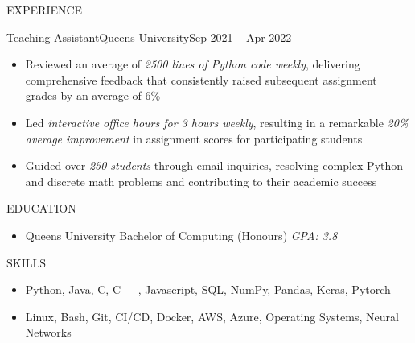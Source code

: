 \documentclass[]{mcdowellcv}
\begin{document}
\begin{cvsection}{EXPERIENCE}
\begin{cvsubsection}{Teaching Assistant}{Queen\textquotesingle{}s University}{Sep 2021 -- Apr 2022}
		\begin{itemize}%
			\item Reviewed an average of \textit{2500 lines of Python code weekly}, delivering comprehensive feedback that consistently raised subsequent assignment grades by an average of 6\%
			\item Led \textit{interactive office hours for 3 hours weekly}, resulting in a remarkable \textit{20\% average improvement} in assignment scores for participating students
			\item Guided over \textit{250 students} through email inquiries, resolving complex Python and discrete math problems and contributing to their academic success
		\end{itemize}
	\end{cvsubsection}
\end{cvsection}
\begin{cvsection}{EDUCATION}
	\begin{cvsubsection}{}{}{}
		\begin{itemize}
			\item Queen\textquotesingle{}s University \textbar{} Bachelor of Computing (Honours) \textbar{} \textit{GPA: 3.8}
		\end{itemize}
	\end{cvsubsection}
\end{cvsection}
\begin{cvsection}{SKILLS}
	\begin{cvsubsection}{}{}{}
		\begin{itemize}
			\item  Python, Java, C, C++, Javascript, SQL, NumPy, Pandas, Keras, Pytorch
			\item  Linux, Bash, Git, CI/CD, Docker, AWS, Azure, Operating Systems, Neural Networks
		\end{itemize}
	\end{cvsubsection}
\end{cvsection}
\ 
\end{document}

